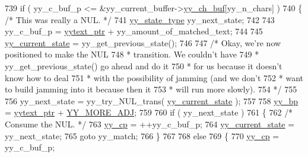 \begin{DoxyCode}
739                 \textcolor{keywordflow}{if} ( yy\_c\_buf\_p <= &yy\_current\_buffer->\mbox{\hyperlink{expr-lex_8cpp_a49f3339224f2ff52f9191b351b184dbd}{yy\_ch\_buf}}[yy\_n\_chars] )
740                         \{ \textcolor{comment}{/* This was really a NUL. */}
741                         \mbox{\hyperlink{expr-lex_8cpp_a9ba7c416f135b0f0c1f4addded4616b5}{yy\_state\_type}} yy\_next\_state;
742 
743                         yy\_c\_buf\_p = \mbox{\hyperlink{expr-lex_8cpp_a790a191a93ef4d3b8c0bb43fd7480052}{yytext\_ptr}} + yy\_amount\_of\_matched\_text;
744 
745                         \mbox{\hyperlink{expr-lex_8cpp_abb8b9672f94e21056888ae611b41cd1b}{yy\_current\_state}} = yy\_get\_previous\_state();
746 
747                         \textcolor{comment}{/* Okay, we're now positioned to make the NUL}
748 \textcolor{comment}{                         * transition.  We couldn't have}
749 \textcolor{comment}{                         * yy\_get\_previous\_state() go ahead and do it}
750 \textcolor{comment}{                         * for us because it doesn't know how to deal}
751 \textcolor{comment}{                         * with the possibility of jamming (and we don't}
752 \textcolor{comment}{                         * want to build jamming into it because then it}
753 \textcolor{comment}{                         * will run more slowly).}
754 \textcolor{comment}{                         */}
755 
756                         yy\_next\_state = yy\_try\_NUL\_trans( \mbox{\hyperlink{expr-lex_8cpp_abb8b9672f94e21056888ae611b41cd1b}{yy\_current\_state}} );
757 
758                         \mbox{\hyperlink{expr-lex_8cpp_a71cf769ce518e8687bf8999b278c65f4}{yy\_bp}} = \mbox{\hyperlink{expr-lex_8cpp_a790a191a93ef4d3b8c0bb43fd7480052}{yytext\_ptr}} + \mbox{\hyperlink{expr-lex_8cpp_a68792d73820bc46a71d3d4e613f0b977}{YY\_MORE\_ADJ}};
759 
760                         \textcolor{keywordflow}{if} ( yy\_next\_state )
761                                 \{
762                                 \textcolor{comment}{/* Consume the NUL. */}
763                                 \mbox{\hyperlink{expr-lex_8cpp_aebf8322d98e81db5af081bb22a5f06fe}{yy\_cp}} = ++yy\_c\_buf\_p;
764                                 \mbox{\hyperlink{expr-lex_8cpp_abb8b9672f94e21056888ae611b41cd1b}{yy\_current\_state}} = yy\_next\_state;
765                                 \textcolor{keywordflow}{goto} yy\_match;
766                                 \}
767 
768                         \textcolor{keywordflow}{else}
769                                 \{
770                                 \mbox{\hyperlink{expr-lex_8cpp_aebf8322d98e81db5af081bb22a5f06fe}{yy\_cp}} = yy\_c\_buf\_p;

\end{DoxyCode}
